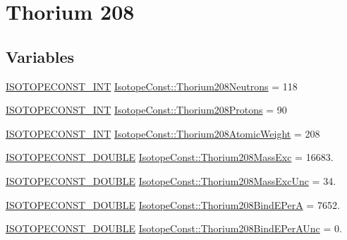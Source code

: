 \hypertarget{group___isotope_const-_thorium-_th208}{}\section{Thorium 208}
\label{group___isotope_const-_thorium-_th208}
\subsection*{Variables}
\begin{DoxyCompactItemize}
\item 
\mbox{\hyperlink{group___isotope_const-_macros_ga5f18360b3e99483a35c32d789e62621c}{I\+S\+O\+T\+O\+P\+E\+C\+O\+N\+S\+T\+\_\+\+I\+NT}} \mbox{\hyperlink{group___isotope_const-_thorium-_th208_ga2286a39d80cb58a1c0c2f5920de6ac18}{Isotope\+Const\+::\+Thorium208\+Neutrons}} = 118
\item 
\mbox{\hyperlink{group___isotope_const-_macros_ga5f18360b3e99483a35c32d789e62621c}{I\+S\+O\+T\+O\+P\+E\+C\+O\+N\+S\+T\+\_\+\+I\+NT}} \mbox{\hyperlink{group___isotope_const-_thorium-_th208_ga7b283393fb5f565f012086535aec5e46}{Isotope\+Const\+::\+Thorium208\+Protons}} = 90
\item 
\mbox{\hyperlink{group___isotope_const-_macros_ga5f18360b3e99483a35c32d789e62621c}{I\+S\+O\+T\+O\+P\+E\+C\+O\+N\+S\+T\+\_\+\+I\+NT}} \mbox{\hyperlink{group___isotope_const-_thorium-_th208_ga8170e78e50122ef9c0a07dd2231a8ce6}{Isotope\+Const\+::\+Thorium208\+Atomic\+Weight}} = 208
\item 
\mbox{\hyperlink{group___isotope_const-_macros_ga8f45a7272ce02c0b4c65c44636ed719a}{I\+S\+O\+T\+O\+P\+E\+C\+O\+N\+S\+T\+\_\+\+D\+O\+U\+B\+LE}} \mbox{\hyperlink{group___isotope_const-_thorium-_th208_ga0853621c781ab985b66c22c74da66a8d}{Isotope\+Const\+::\+Thorium208\+Mass\+Exc}} = 16683.
\item 
\mbox{\hyperlink{group___isotope_const-_macros_ga8f45a7272ce02c0b4c65c44636ed719a}{I\+S\+O\+T\+O\+P\+E\+C\+O\+N\+S\+T\+\_\+\+D\+O\+U\+B\+LE}} \mbox{\hyperlink{group___isotope_const-_thorium-_th208_ga9d87941c94905c49cb9137367022edf7}{Isotope\+Const\+::\+Thorium208\+Mass\+Exc\+Unc}} = 34.
\item 
\mbox{\hyperlink{group___isotope_const-_macros_ga8f45a7272ce02c0b4c65c44636ed719a}{I\+S\+O\+T\+O\+P\+E\+C\+O\+N\+S\+T\+\_\+\+D\+O\+U\+B\+LE}} \mbox{\hyperlink{group___isotope_const-_thorium-_th208_ga7f5242f8c13eafc1bc5d28e8e5a59b16}{Isotope\+Const\+::\+Thorium208\+Bind\+E\+PerA}} = 7652.
\item 
\mbox{\hyperlink{group___isotope_const-_macros_ga8f45a7272ce02c0b4c65c44636ed719a}{I\+S\+O\+T\+O\+P\+E\+C\+O\+N\+S\+T\+\_\+\+D\+O\+U\+B\+LE}} \mbox{\hyperlink{group___isotope_const-_thorium-_th208_ga955628d4bf5530dea8bdc15b0e8cc01c}{Isotope\+Const\+::\+Thorium208\+Bind\+E\+Per\+A\+Unc}} = 0.

\end{DoxyCompactItemize}
